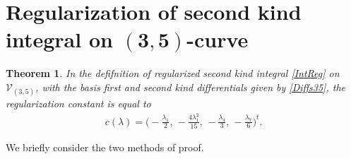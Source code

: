 \documentclass[pdftex]{sigma}
\numberwithin{equation}{section}
\newtheorem{Theorem}{Theorem}[section]
\begin{document}
\section[Regularization of second kind integral on $(3,5)$-curve]{Regularization of second kind integral on $\boldsymbol{(3,5)}$-curve}\label{s:Reg35}
\begin{Theorem}\label{T:Reg35}
In the defifnition of regularized second kind integral \eqref{IntReg} on $\mathcal{V}_{(3,5)}$, {with the basis first and second kind differentials given by \eqref{Diffs35}, the regularization constant is equal to}
 \begin{gather}\label{C35const}
 c(\lambda) = \bigg({-}\frac{\lambda_1}{2},\, -\frac{4\lambda_1^2}{15},\,
 -\frac{\lambda_4}{3},\, {-}\frac{\lambda_7}{6} \bigg)^t.
\end{gather}
\end{Theorem}
We briefly consider the two methods of proof.
\end{document}
